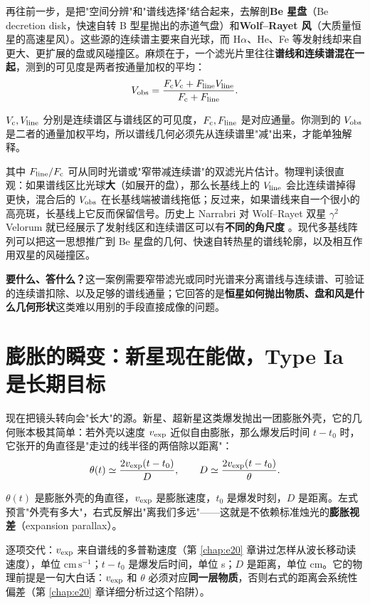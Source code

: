 再往前一步，是把"空间分辨"和"谱线选择"结合起来，去解剖\textbf{Be 星盘}（Be decretion disk，快速自转 B 型星抛出的赤道气盘）和\textbf{Wolf--Rayet 风}（大质量恒星的高速星风）。这些源的连续谱主要来自光球，而 \(\mathrm{H}\alpha\)、He、Fe 等发射线却来自更大、更扩展的盘或风碰撞区。麻烦在于，一个滤光片里往往\textbf{谱线和连续谱混在一起}，测到的可见度是两者按通量加权的平均：
\begin{equation}
  V_{\rm obs}
  =
  \frac{
  F_{\rm c}V_{\rm c}
  +
  F_{\rm line}V_{\rm line}
  }{
  F_{\rm c}+F_{\rm line}
  } .
  \label{eq:e25-line-continuum}
\end{equation}
\begin{formulaexplain}
\(V_{\rm c},V_{\rm line}\) 分别是连续谱区与谱线区的可见度，\(F_{\rm c},F_{\rm line}\) 是对应通量。你测到的 \(V_{\rm obs}\) 是二者的通量加权平均，所以谱线几何必须先从连续谱里"减"出来，才能单独解释。
\end{formulaexplain}
其中 \(F_{\rm line}/F_{\rm c}\) 可从同时光谱或"窄带减连续谱"的双滤光片估计。物理判读很直观：如果谱线区比光球\textbf{大}（如展开的盘），那么长基线上的 \(V_{\rm line}\) 会比连续谱掉得更快，混合后的 \(V_{\rm obs}\) 在长基线端被谱线拖低；反过来，如果谱线来自一个很小的高亮斑，长基线上它反而保留信号。历史上 Narrabri 对 Wolf--Rayet 双星 \(\gamma^2\) Velorum 就已经展示了发射线区和连续谱区可以有\textbf{不同的角尺度} \citep{1970MNRAS.148..103H,2010SPIE.7734E..0AD,2012NewAR..56..143D,2025ApJ...995..191A}。现代多基线阵列可以把这一思想推广到 Be 星盘的几何、快速自转热星的谱线轮廓，以及相互作用双星的风碰撞区。

\textbf{要什么、答什么？}这一案例需要窄带滤光或同时光谱来分离谱线与连续谱、可验证的连续谱扣除、以及足够的谱线通量；它回答的是\textbf{恒星如何抛出物质、盘和风是什么几何形状}这类难以用别的手段直接成像的问题。

\section{膨胀的瞬变：新星现在能做，Type Ia 是长期目标}
\label{sec:e25-transient}

现在把镜头转向会"长大"的源。新星、超新星这类爆发抛出一团膨胀外壳，它的几何账本极其简单：若外壳以速度 \(v_{\rm exp}\) 近似自由膨胀，那么爆发后时间 \(t-t_0\) 时，它张开的角直径是"走过的线半径的两倍除以距离"：
\begin{equation}
  \theta(t)
  \simeq
  \frac{2v_{\rm exp}(t-t_0)}{D},
  \qquad
  D
  \simeq
  \frac{2v_{\rm exp}(t-t_0)}{\theta}.
  \label{eq:e25-expansion}
\end{equation}
\begin{formulaexplain}
\(\theta(t)\) 是膨胀外壳的角直径，\(v_{\rm exp}\) 是膨胀速度，\(t_0\) 是爆发时刻，\(D\) 是距离。左式预言"外壳有多大"，右式反解出"离我们多远"——这就是不依赖标准烛光的\textbf{膨胀视差}（expansion parallax）。
\end{formulaexplain}
逐项交代：\(v_{\rm exp}\) 来自谱线的多普勒速度（第 \ref{chap:e20} 章讲过怎样从波长移动读速度），单位 \(\mathrm{cm\,s^{-1}}\)；\(t-t_0\) 是爆发后时间，单位 s；\(D\) 是距离，单位 cm。它的物理前提是一句大白话：\(v_{\rm exp}\) 和 \(\theta\) 必须对应\textbf{同一层物质}，否则右式的距离会系统性偏差（第 \ref{chap:e20} 章详细分析过这个陷阱）。

